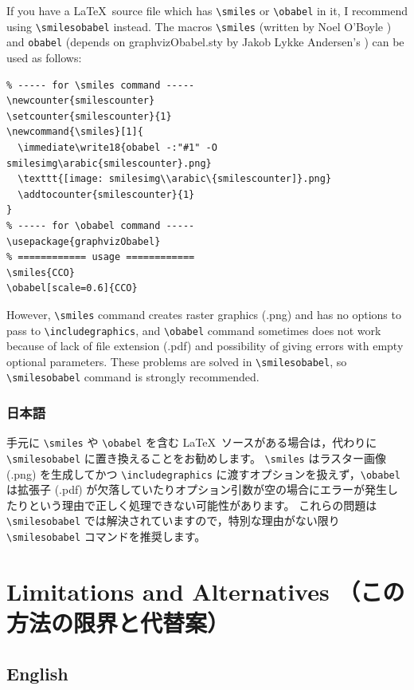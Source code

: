 \documentclass[12pt]{jsarticle}
\begin{document}
If you have a \LaTeX\ source file which has \verb|\smiles| or \verb|\obabel| in it, I recommend using \verb|\smilesobabel| instead.
The macros \verb|\smiles| (written by Noel O'Boyle \cite{NOB1}) and \verb|obabel| (depends on \textsf{graphvizObabel.sty} by Jakob Lykke Andersen's \cite{JLA}) can be used as follows:
\begin{verbatim}
% ----- for \smiles command -----
\newcounter{smilescounter}
\setcounter{smilescounter}{1}
\newcommand{\smiles}[1]{
  \immediate\write18{obabel -:"#1" -O smilesimg\arabic{smilescounter}.png}
  \texttt{[image: smilesimg\\arabic\{smilescounter]}.png}
  \addtocounter{smilescounter}{1}
}
% ----- for \obabel command -----
\usepackage{graphvizObabel}
% ============ usage ============
\smiles{CCO}
\obabel[scale=0.6]{CCO}
\end{verbatim}
However, \verb|\smiles| command creates raster graphics (.png) and has no options to pass to \verb|\includegraphics|, and \verb|\obabel| command sometimes does not work because of lack of file extension (.pdf) and possibility of giving errors with empty optional parameters.
These problems are solved in \verb|\smilesobabel|, so \verb|\smilesobabel| command is strongly recommended.

\subsubsection{日本語}

手元に \verb|\smiles| や \verb|\obabel| を含む \LaTeX\ ソースがある場合は，代わりに \verb|\smilesobabel| に置き換えることをお勧めします。
\verb|\smiles| はラスター画像 (.png) を生成してかつ \verb|\includegraphics| に渡すオプションを扱えず，\verb|\obabel| は拡張子 (.pdf) が欠落していたりオプション引数が空の場合にエラーが発生したりという理由で正しく処理できない可能性があります。
これらの問題は \verb|\smilesobabel| では解決されていますので，特別な理由がない限り \verb|\smilesobabel| コマンドを推奨します。

\clearpage

\section{Limitations and Alternatives （この方法の限界と代替案）}

\subsection{English}
\end{document}
